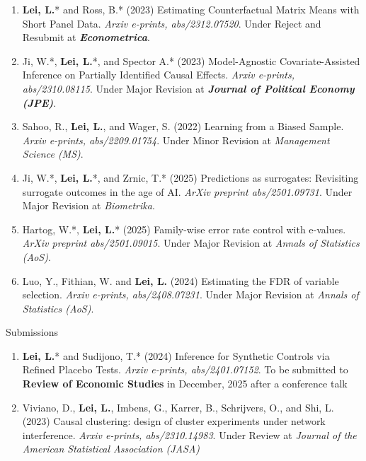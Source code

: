 \documentclass{article}
\begin{document}
\begin{enumerate}
\item \textbf{Lei, L.}* and Ross, B.* (2023) Estimating Counterfactual Matrix Means with Short Panel Data. \emph{Arxiv e-prints, abs/2312.07520}. Under Reject and Resubmit at \emph{\textbf{Econometrica}}.
\item {\color{red}Ji, W.*, \textbf{Lei, L.}*, and Spector A.* (2023) Model-Agnostic Covariate-Assisted Inference on Partially Identified Causal Effects. \emph{Arxiv e-prints, abs/2310.08115}. Under Major Revision at \emph{\textbf{Journal of Political Economy (JPE)}}.}
\item Sahoo, R., \textbf{Lei, L.}, and Wager, S. (2022) Learning from a Biased Sample. \emph{Arxiv e-prints, abs/2209.01754}. {\color{red}Under Minor Revision at \emph{Management Science (MS)}}.  
\item {\color{red}Ji, W.*, \textbf{Lei, L.}*, and Zrnic, T.* (2025) Predictions as surrogates: Revisiting surrogate outcomes in the age of AI. \emph{ArXiv preprint abs/2501.09731}. Under Major Revision at \emph{Biometrika}.}
\item {\color{red}Hartog, W.*, \textbf{Lei, L.}* (2025) Family-wise error rate control with e-values. \emph{ArXiv preprint abs/2501.09015}. Under Major Revision at \emph{Annals of Statistics (AoS)}.}
\item {\color{red}Luo, Y., Fithian, W. and \textbf{Lei, L.} (2024) Estimating the FDR of variable selection. \emph{Arxiv e-prints, abs/2408.07231}. Under Major Revision at \emph{Annals of Statistics (AoS)}}.
\end{enumerate}

{\color{red}
\begin{large}
\noindent Submissions
\end{large}

\begin{enumerate}
\item \textbf{Lei, L.}* and Sudijono, T.* (2024) Inference for Synthetic Controls via Refined Placebo Tests. \emph{Arxiv e-prints, abs/2401.07152}. To be submitted to \textbf{\textbf{Review of Economic Studies}} in December, 2025 after a conference talk
\item Viviano, D., \textbf{Lei, L.}, Imbens, G., Karrer, B., Schrijvers, O., and Shi, L. (2023) Causal clustering: design of cluster experiments under network interference. \emph{Arxiv e-prints, abs/2310.14983}. Under Review at \emph{Journal of the American Statistical Association (JASA)}
\end{enumerate}
}
\end{document}
